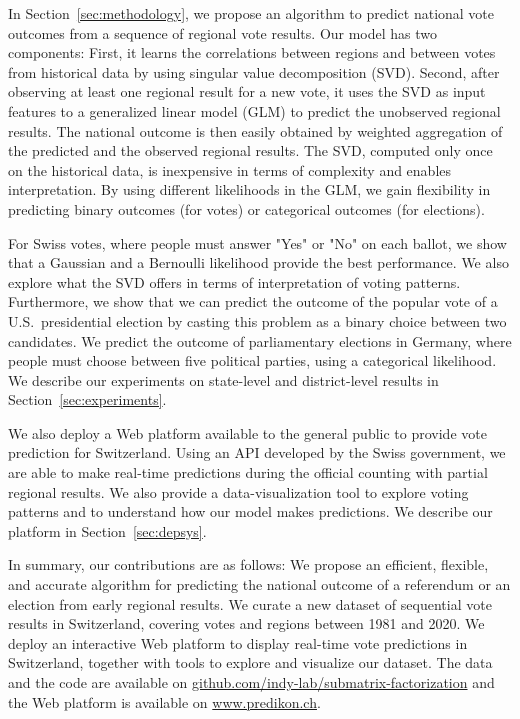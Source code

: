 In Section~\ref{sec:methodology}, we propose an algorithm to predict national vote outcomes from a sequence of regional vote results.
Our model has two components:
First, it learns the correlations between regions and between votes from historical data by using singular value decomposition (SVD).
Second, after observing at least one regional result for a new vote, it uses the SVD as input features to a generalized linear model (GLM) to predict the unobserved regional results.
The national outcome is then easily obtained by weighted aggregation of the predicted and the observed regional results.
The SVD, computed only once on the historical data, is inexpensive in terms of complexity and enables interpretation.
By using different likelihoods in the GLM, we gain flexibility in predicting binary outcomes (for votes) or categorical outcomes (for elections).

For Swiss votes, where people must answer "Yes" or "No" on each ballot, we show that a Gaussian and a Bernoulli likelihood provide the best performance.
We also explore what the SVD offers in terms of interpretation of voting patterns.
Furthermore, we show that we can predict the outcome of the popular vote of a U.S.\ presidential election by casting this problem as a binary choice between two candidates.
We predict the outcome of parliamentary elections in Germany, where people must choose between five political parties, using a categorical likelihood.
We describe our experiments on state-level and district-level results in Section~\ref{sec:experiments}.

We also deploy a Web platform available to the general public to provide vote prediction for Switzerland.
Using an API developed by the Swiss government, we are able to make real-time predictions during the official counting with partial regional results.
We also provide a data-visualization tool to explore voting patterns and to understand how our model makes predictions.
We describe our platform in Section~\ref{sec:depsys}.

In summary, our contributions are as follows:
We propose an efficient, flexible, and accurate algorithm for predicting the national outcome of a referendum or an election from early regional results.
We curate a new dataset of sequential vote results in Switzerland, covering  votes and  regions between 1981 and 2020.
We deploy an interactive Web platform to display real-time vote predictions in Switzerland, together with tools to explore and visualize our dataset.
The data and the code are available on \href{https://www.github.com/indy-lab/submatrix-factorization}{github.com/indy-lab/submatrix-factorization} and the Web platform is available on \href{http://www.predikon.ch}{www.predikon.ch}.
